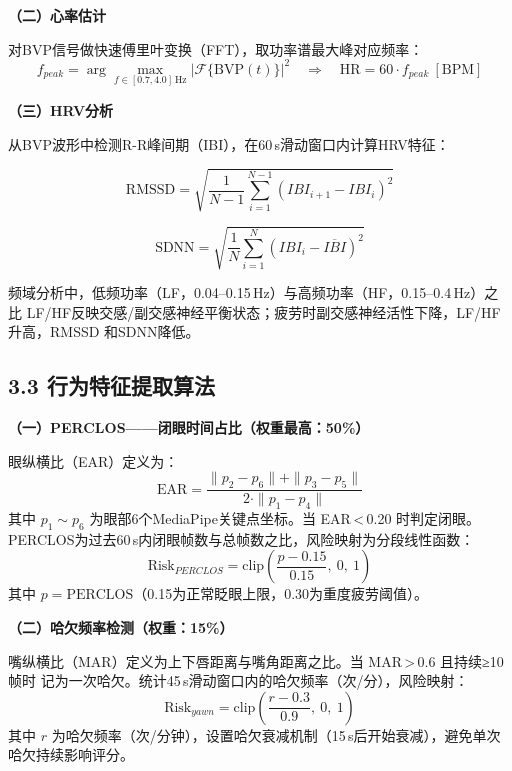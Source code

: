 \documentclass[a4paper,12pt]{article}
\begin{document}
\textbf{（二）心率估计}

对BVP信号做快速傅里叶变换（FFT），取功率谱最大峰对应频率：
\begin{equation}
  f_{peak} = \arg\max_{f \in [0.7, 4.0]\,\text{Hz}} |\mathcal{F}\{\text{BVP}(t)\}|^2
  \quad\Rightarrow\quad \text{HR} = 60\cdot f_{peak}\ [\text{BPM}]
\end{equation}

\textbf{（三）HRV分析}

从BVP波形中检测R-R峰间期（IBI），在60\,s滑动窗口内计算HRV特征：

\begin{equation}
  \text{RMSSD} = \sqrt{\frac{1}{N-1}\sum_{i=1}^{N-1}(IBI_{i+1}-IBI_i)^2}
\end{equation}

\begin{equation}
  \text{SDNN} = \sqrt{\frac{1}{N}\sum_{i=1}^{N}(IBI_i - \overline{IBI})^2}
\end{equation}

频域分析中，低频功率（LF，0.04--0.15\,Hz）与高频功率（HF，0.15--0.4\,Hz）之比
LF/HF反映交感/副交感神经平衡状态；疲劳时副交感神经活性下降，LF/HF升高，RMSSD
和SDNN降低。

\subsection*{3.3 行为特征提取算法}

\textbf{（一）PERCLOS——闭眼时间占比（权重最高：50\%）}

眼纵横比（EAR）定义为：
\begin{equation}
  \text{EAR} = \frac{\|p_2-p_6\| + \|p_3-p_5\|}{2\cdot\|p_1-p_4\|}
\end{equation}
其中 $p_1\sim p_6$ 为眼部6个MediaPipe关键点坐标。当 EAR\,<\,0.20 时判定闭眼。
PERCLOS为过去60\,s内闭眼帧数与总帧数之比，风险映射为分段线性函数：
\begin{equation}
  \text{Risk}_{PERCLOS} = \text{clip}\!\left(\frac{p-0.15}{0.15},\ 0,\ 1\right)
\end{equation}
其中 $p=\text{PERCLOS}$（0.15为正常眨眼上限，0.30为重度疲劳阈值）。

\textbf{（二）哈欠频率检测（权重：15\%）}

嘴纵横比（MAR）定义为上下唇距离与嘴角距离之比。当 MAR\,>\,0.6 且持续≥10帧时
记为一次哈欠。统计45\,s滑动窗口内的哈欠频率（次/分），风险映射：
\begin{equation}
  \text{Risk}_{yawn} = \text{clip}\!\left(\frac{r-0.3}{0.9},\ 0,\ 1\right)
\end{equation}
其中 $r$ 为哈欠频率（次/分钟），设置哈欠衰减机制（15\,s后开始衰减），避免单次哈欠持续影响评分。
\end{document}
